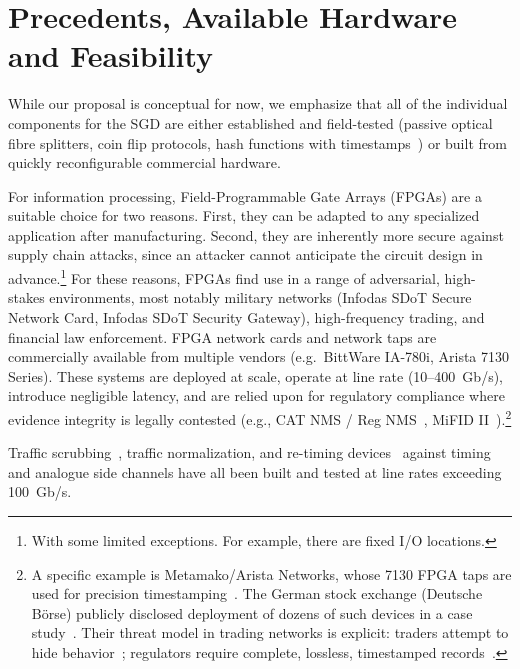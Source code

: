 \documentclass{article}
\begin{document}
\section{Precedents, Available Hardware and Feasibility}
\label{app:feasibility}

While our proposal is conceptual for now, we emphasize that all of the individual components for the SGD are either established and field-tested (passive optical fibre splitters, coin flip protocols, hash functions with timestamps~\cite{digicert_rfc3161}) or built from quickly reconfigurable commercial hardware.

For information processing, Field-Programmable Gate Arrays (FPGAs) are a suitable choice for two reasons. First, they can be adapted to any specialized application after manufacturing. Second, they are inherently more secure against supply chain attacks, since an attacker cannot anticipate the circuit design in advance.\footnote{With some limited exceptions. For example, there are fixed I/O locations.} For these reasons, FPGAs find use in a range of adversarial, high-stakes environments, most notably military networks (Infodas SDoT Secure Network Card, Infodas SDoT Security Gateway), high-frequency trading, and financial law enforcement. FPGA network cards and network taps are commercially available from multiple vendors (e.g.\ BittWare IA-780i, Arista 7130 Series). These systems are deployed at scale, operate at line rate (10--400~Gb/s), introduce negligible latency, and are relied upon for regulatory compliance where evidence integrity is legally contested (e.g., CAT NMS / Reg NMS~\cite{sec_rule613}, MiFID II~\cite{ateam_mifid2}).\footnote{A specific example is Metamako/Arista Networks, whose 7130 FPGA taps are used for precision timestamping~\cite{arista_timestamps}. The German stock exchange (Deutsche B\"orse) publicly disclosed deployment of dozens of such devices in a case study~\cite{arista_deutscheboerse}. Their threat model in trading networks is explicit: traders attempt to hide behavior~\cite{cftc_panther}; regulators require complete, lossless, timestamped records~\cite{arista_timestamps}.}

Traffic scrubbing~\cite{xing2020netwarden}, traffic normalization, and re-timing devices~\cite{uttarwar2025delay} against timing and analogue side channels have all been built and tested at line rates exceeding 100~Gb/s.
\end{document}
